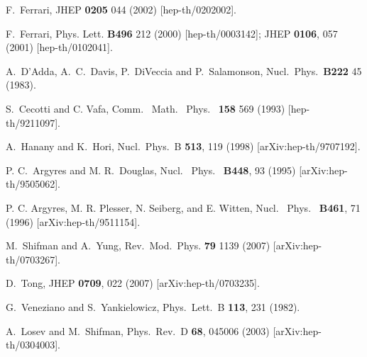 \documentclass[epsfig,12pt]{article}
\newcommand{\ntwo}{${\mathcal N}=2$}
\begin{document}
\begin{thebibliography}{99}
  F.~Ferrari,
  JHEP {\bf 0205} 044 (2002)
  [hep-th/0202002].

  F.~Ferrari,
   Phys. Lett. {\bf B496} 212 (2000)
  [hep-th/0003142];
  JHEP {\bf 0106}, 057 (2001)
  [hep-th/0102041].

  A.~D'Adda, A.~C.~Davis, P.~DiVeccia and P.~Salamonson,
  Nucl.\ Phys.\ {\bf B222} 45 (1983).

  S.~Cecotti and C. Vafa,
  Comm. \ Math. \ Phys. \ {\bf 158} 569 (1993)
  [hep-th/9211097].

  A.~Hanany and K.~Hori,
  Nucl.\ Phys.\  B {\bf 513}, 119 (1998)
  [arXiv:hep-th/9707192].

  P. C.~Argyres and M. R.~Douglas,
  Nucl. \ Phys. \ {\bf B448}, 93 (1995)   
  [arXiv:hep-th/9505062].
  
  P. C. Argyres, M. R. Plesser, N. Seiberg, and E. Witten,
  Nucl. \ Phys.  \ {\bf B461}, 71 (1996) 
  [arXiv:hep-th/9511154].

  M.~Shifman and A.~Yung,
  Rev.\ Mod.\ Phys. {\bf 79} 1139 (2007)
  [arXiv:hep-th/0703267].

  D.~Tong,
  JHEP {\bf 0709}, 022 (2007)
  [arXiv:hep-th/0703235].
  
  G.~Veneziano and S.~Yankielowicz,
  Phys.\ Lett.\  B {\bf 113}, 231 (1982).
  
  A.~Losev and M.~Shifman,
  Phys.\ Rev.\  D {\bf 68}, 045006 (2003)
  [arXiv:hep-th/0304003].
  

\end{thebibliography}
\end{document}
